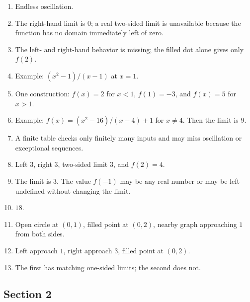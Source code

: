 \documentclass[11pt,openany]{book}
\theoremstyle{bgplain}
\begin{document}
\begin{enumerate}[label=\textbf{1.\arabic*}]
  \item Endless oscillation.
  \item The right-hand limit is \(0\); a real two-sided limit is unavailable because the function has no domain immediately left of zero.
  \item The left- and right-hand behavior is missing; the filled dot alone gives only \(f(2)\).
  \item Example: \((x^2-1)/(x-1)\) at \(x=1\).
  \item One construction: \(f(x)=2\) for \(x<1\), \(f(1)=-3\), and \(f(x)=5\) for \(x>1\).
  \item Example: \(f(x)=(x^2-16)/(x-4)+1\) for \(x\ne4\). Then the limit is \(9\).
  \item A finite table checks only finitely many inputs and may miss oscillation or exceptional sequences.
  \item Left \(3\), right \(3\), two-sided limit \(3\), and \(f(2)=4\).
  \item The limit is \(3\). The value \(f(-1)\) may be any real number or may be left undefined without changing the limit.
  \item \(18\).
  \item Open circle at \((0,1)\), filled point at \((0,2)\), nearby graph approaching \(1\) from both sides.
  \item Left approach \(1\), right approach \(3\), filled point at \((0,2)\).
  \item The first has matching one-sided limits; the second does not.
\end{enumerate}

\subsection*{Section 2}
\end{document}
